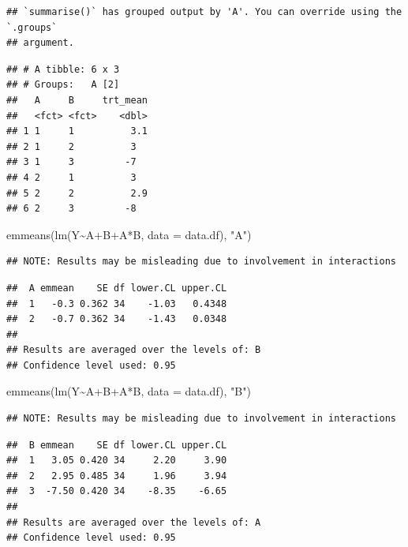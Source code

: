 \documentclass[
]{book}
\newenvironment{Shaded}{\begin{snugshade}}{\end{snugshade}}
\newcommand{\AttributeTok}[1]{\textcolor[rgb]{0.77,0.63,0.00}{#1}}
\newcommand{\FunctionTok}[1]{\textcolor[rgb]{0.00,0.00,0.00}{#1}}
\newcommand{\NormalTok}[1]{#1}
\newcommand{\SpecialCharTok}[1]{\textcolor[rgb]{0.00,0.00,0.00}{#1}}
\newcommand{\StringTok}[1]{\textcolor[rgb]{0.31,0.60,0.02}{#1}}
\begin{document}
\begin{verbatim}
## `summarise()` has grouped output by 'A'. You can override using the `.groups`
## argument.
\end{verbatim}

\begin{verbatim}
## # A tibble: 6 x 3
## # Groups:   A [2]
##   A     B     trt_mean
##   <fct> <fct>    <dbl>
## 1 1     1          3.1
## 2 1     2          3  
## 3 1     3         -7  
## 4 2     1          3  
## 5 2     2          2.9
## 6 2     3         -8
\end{verbatim}

\begin{Shaded}
\begin{Highlighting}[]
\FunctionTok{emmeans}\NormalTok{(}\FunctionTok{lm}\NormalTok{(Y}\SpecialCharTok{\textasciitilde{}}\NormalTok{A}\SpecialCharTok{+}\NormalTok{B}\SpecialCharTok{+}\NormalTok{A}\SpecialCharTok{*}\NormalTok{B, }\AttributeTok{data =}\NormalTok{ data.df), }\StringTok{"A"}\NormalTok{)}
\end{Highlighting}
\end{Shaded}

\begin{verbatim}
## NOTE: Results may be misleading due to involvement in interactions
\end{verbatim}

\begin{verbatim}
##  A emmean    SE df lower.CL upper.CL
##  1   -0.3 0.362 34    -1.03   0.4348
##  2   -0.7 0.362 34    -1.43   0.0348
## 
## Results are averaged over the levels of: B 
## Confidence level used: 0.95
\end{verbatim}

\begin{Shaded}
\begin{Highlighting}[]
\FunctionTok{emmeans}\NormalTok{(}\FunctionTok{lm}\NormalTok{(Y}\SpecialCharTok{\textasciitilde{}}\NormalTok{A}\SpecialCharTok{+}\NormalTok{B}\SpecialCharTok{+}\NormalTok{A}\SpecialCharTok{*}\NormalTok{B, }\AttributeTok{data =}\NormalTok{ data.df), }\StringTok{"B"}\NormalTok{)}
\end{Highlighting}
\end{Shaded}

\begin{verbatim}
## NOTE: Results may be misleading due to involvement in interactions
\end{verbatim}

\begin{verbatim}
##  B emmean    SE df lower.CL upper.CL
##  1   3.05 0.420 34     2.20     3.90
##  2   2.95 0.485 34     1.96     3.94
##  3  -7.50 0.420 34    -8.35    -6.65
## 
## Results are averaged over the levels of: A 
## Confidence level used: 0.95
\end{verbatim}
\end{document}
